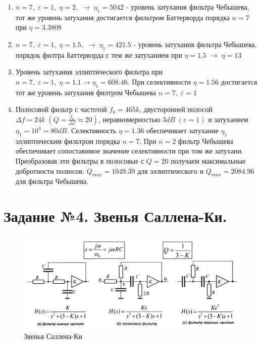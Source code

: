 \documentclass[12pt,a4paper]{article}
\begin{document}
\begin{enumerate}
\item $n = 7, \; \varepsilon = 1, \; \eta = 2, \; \rightarrow \; \eta_1 = 5042$ - уровень затухания фильтра Чебышева,
тот же уровень затухания достигается фильтром Баттерворда порядка $n = 7$ при $\eta = 3.3808$

\item $n = 7, \; \varepsilon = 1, \; \eta = 1.5, \; \rightarrow \; \eta_1 = 421.5$ - уровень затухания фильтра Чебышева, порядок филтра Баттерворда с тем же затуханием
при $\eta = 1.5 \; \rightarrow \; \eta = 13$

\item Уровень затухания эллиптического фильтра при $n = 7, \; \varepsilon = 1, \; \eta = 1.1 \rightarrow \eta_1 = 608.46$.
При селективности $\eta = 1.56$ достигается тот же уровень затухания филтром Чебышева $n = 7, \; \varepsilon = 1$

\item Полосовой фильтр с частотой $f_0 = 465k$, двусторонней полосой $\Delta f = 24 k \; (Q = \frac{f_0}{\Delta f} \approx 20)$,
неравномерностью $3dB\; (\varepsilon = 1)$ и затуханием $\eta_1 = 10^4 = 80 dB$. Селективность $\eta = 1.36$
обеспечивает затухание $\eta_1$ эллиптическим фильтром порядка $n = 7$. При $n =2$ фильтр Чебышева обеспечивает сопоставимое значение селективности при том же
затухани. Преобразовав эти фильтры в полосовые с $Q = 20$ получаем максимальные добротности полюсов: $Q_{max} = 1049.39$ для эллиптического и $Q_{max} = 2084.96$ для
фильтра Чебышева.

\end{enumerate}


\graphicspath{ {pictures/} }

\section{Задание №4. Звенья Саллена-Ки.}


\begin{figure}[H]
    \begin{center}
        \includegraphics[scale = 0.6]{pic4.png}
        \caption{Звенья Саллена-Ки}
        \label{Sallen-Ki}
    \end{center}
\end{figure}
\end{document}
